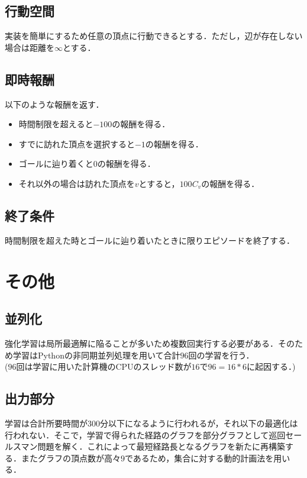 \documentclass[a4paper,12pt]{jsreport}
\theoremstyle{definition}
\begin{document}
\subsection{行動空間}
実装を簡単にするため任意の頂点に行動できるとする．ただし，辺が存在しない場合は距離を$\infty$とする．
\subsection{即時報酬}
以下のような報酬を返す．
\begin{itemize}
  \item 時間制限を超えると$-100$の報酬を得る．
  \item すでに訪れた頂点を選択すると$-1$の報酬を得る．
  \item ゴールに辿り着くと$0$の報酬を得る．
  \item それ以外の場合は訪れた頂点を$v$とすると，$100C_v$の報酬を得る．
\end{itemize}
\subsection{終了条件}
時間制限を超えた時とゴールに辿り着いたときに限りエピソードを終了する．
\section{その他}
\subsection{並列化}
強化学習は局所最適解に陥ることが多いため複数回実行する必要がある．そのため学習はPythonの非同期並列処理を用いて合計$96$回の学習を行う．\\ 
($96$回は学習に用いた計算機のCPUのスレッド数が$16$で$96=16*6$に起因する．)
\subsection{出力部分}
学習は合計所要時間が$300$分以下になるように行われるが，それ以下の最適化は行われない．そこで，学習で得られた経路のグラフを部分グラフとして巡回セールスマン問題を解く．これによって最短経路長となるグラフを新たに再構築する．またグラフの頂点数が高々$9$であるため，集合に対する動的計画法を用いる．
\end{document}
